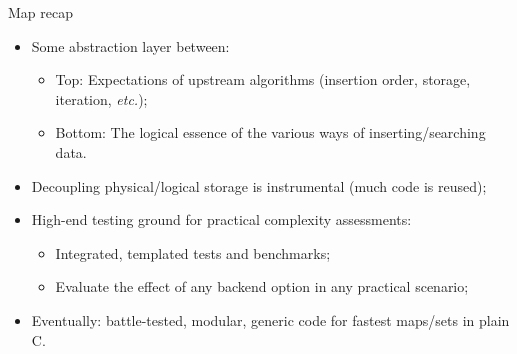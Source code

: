 \begin{frame}[fragile]{Map recap}

  \begin{itemize}
  \item Some abstraction layer between:
    \begin{itemize}
    \item Top: Expectations of upstream algorithms (insertion order, storage, iteration, {\em etc.});
    \item Bottom: The logical essence of the various ways of inserting/searching data.
    \end{itemize}

  \item Decoupling physical/logical storage is instrumental (much code is reused);
  \item High-end testing ground for practical complexity assessments:
    \begin{itemize}
    \item Integrated, templated tests and benchmarks;
    \item Evaluate the effect of any backend option in any practical scenario;
    \end{itemize}
    \item Eventually: battle-tested, modular, generic code for fastest maps/sets in plain C.
  \end{itemize}

\end{frame}


